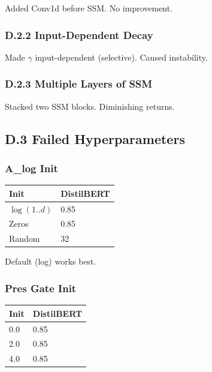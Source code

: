 Added Conv1d before SSM. No improvement.

\subsubsection{D.2.2 Input-Dependent Decay}

Made $\gamma$ input-dependent (selective). Caused instability.

\subsubsection{D.2.3 Multiple Layers of SSM}

Stacked two SSM blocks. Diminishing returns.

\subsection{D.3 Failed Hyperparameters}

\subsubsection{A\_log Init}

\begin{table}[H]
\centering
\small
\begin{tabular}{ll}
\toprule
\textbf{Init} & \textbf{DistilBERT} \\
\midrule
$\log(1..d)$ & 0.85 \\
Zeros & 0.85 \\
Random & 32 \\
\bottomrule
\end{tabular}
\end{table}

Default (log) works best.

\subsubsection{Pres Gate Init}

\begin{table}[H]
\centering
\small
\begin{tabular}{ll}
\toprule
\textbf{Init} & \textbf{DistilBERT} \\
\midrule
0.0 & 0.85 \\
2.0 & 0.85 \\
4.0 & 0.85 \\
\bottomrule
\end{tabular}
\end{table}

